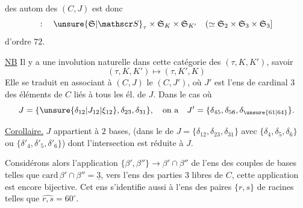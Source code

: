 des autom des $(C,J)$ est donc 
\[
:\quad \unsure{\mathfrak S|\mathscr S}_\tau\times\mathfrak S_K\times\mathfrak S_{K'}\quad(\simeq\mathfrak S_2\times\mathfrak S_3\times\mathfrak S_3]
\]
d'ordre $72$.

\uline{NB} Il y a une involution naturelle dans cette catégorie des $(\tau,K,K')$, savoir
\[
(\tau,K,K')\longmapsto(\tau,K',K)
\]
Elle se traduit en associant à $(C,J)$ le $(C,J')$, où $J'$ est l'ens de cardinal $3$ des éléments de $C$ liés à tous les él. de $J$. Dans le cas où
\[
J=\{\unsure{\delta_{12}|J_{12}|\xi_{12}},\delta_{23},\delta_{31}\},\quad\text{on a}\quad J'=\{\delta_{45},\delta_{56},\delta_{\unsure{61|64}}\}.
\]

\uline{Corollaire.} $J$ appartient à  $2$ bases,   (dans  le  de $J=\{\delta_{12},\delta_{23},\delta_{31}\}$ avec $\{\delta_4,\delta_5,\delta_6\}$ ou $\{\delta'_4,\delta'_5,\delta'_6\}$) dont l'intersection est réduite à $J$. 

Considérons alors l'application $\{\beta',\beta''\}\longrightarrow\beta'\cap\beta''$ de l'ens des couples de bases telles que $\mathrm{card}\,\beta'\cap\beta''=\underline{3}$, vers l'ens des parties $3$ libres de $C$, cette application est encore bijective. Cet ens s'identifie aussi à l'ens des paires $\{r,s\}$ de racines telles que $\widehat{r,s}=60^\circ$.
